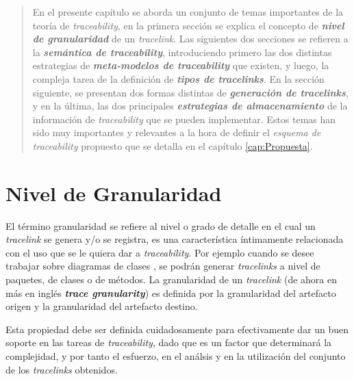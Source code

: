 \documentclass[a4paper,12pt,twoside,spanish,openright]{book}
\begin{document}
\begin{quotation}

En el presente capítulo se aborda un conjunto de temas importantes de la teoría de \textit{traceability}, en la primera sección se explica el concepto de \textit{\textbf{nivel de granularidad}} de un \textit{tracelink}. Las siguientes dos secciones se refieren a la \textit{\textbf{semántica de traceability}}, introduciendo primero las dos distintas estrategias de \textit{\textbf{meta-modelos de traceability}} que existen, y luego, la compleja tarea de la definición de \textit{\textbf{tipos de tracelinks}}. En la sección siguiente, se presentan dos formas distintas de \textit{\textbf{generación de tracelinks}}, y en la última, las dos principales \textit{\textbf{estrategias de almacenamiento}}  de la información de \textit{traceability} que se pueden implementar. Estos temas han sido muy importantes y relevantes a la hora de definir el \textit{esquema de traceability} propuesto que se detalla en el capítulo \ref{cap:Propuesta}.

\end{quotation}


\bigskip


\minitoc 


\clearpage


\section{Nivel de Granularidad}
\label{sec:NivelGranularidad}

El término granularidad se refiere al nivel o grado de detalle en el cual un \textit{tracelink} se genera y/o se registra, es una característica íntimamente relacionada con el uso que se le quiera dar a \textit{traceability}. Por ejemplo cuando se desee trabajar sobre diagramas de clases , se podrán generar \textit{tracelinks} a nivel de paquetes, de clases o de métodos. La granularidad de un \textit{tracelink} (de ahora en más en inglés \textit{\textbf{trace granularity}}) es definida por la granularidad del artefacto origen y la granularidad del artefacto destino.

Esta propiedad debe ser definida cuidadosamente para efectivamente dar un buen soporte en las tareas de \textit{traceability}, dado que es un factor que determinará la complejidad, y por tanto el esfuerzo, en el análsis y en la utilización del conjunto de los \textit{tracelinks} obtenidos.
\end{document}
